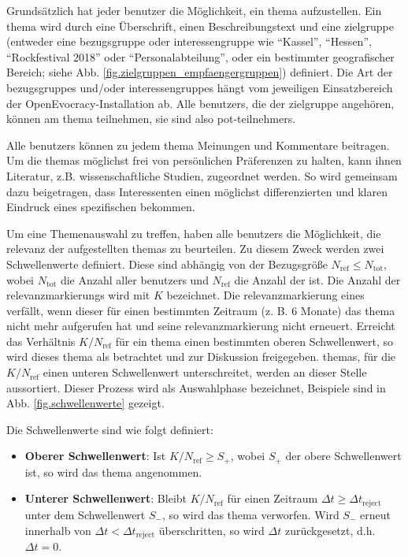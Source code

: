 \documentclass[10pt]{article}
\begin{document}
Grundsätzlich hat jeder \gls{benutzer} die Möglichkeit, ein \gls{thema} aufzustellen. Ein \gls{thema} wird durch eine Überschrift, einen Beschreibungstext und eine \gls{zielgruppe} (entweder eine \gls{bezugsgruppe} oder \gls{interessengruppe} wie ``Kassel'', ``Hessen'', ``Rockfestival 2018'' oder ``Personalabteilung'', oder ein bestimmter geografischer Bereich; siehe Abb. \ref{fig.zielgruppen_empfaengergruppen}) definiert. Die Art der \glspl{bezugsgruppe} und/oder \glspl{interessengruppe} hängt vom jeweiligen Einsatzbereich der OpenEvocracy-Installation ab. Alle \glspl{benutzer}, die der \gls{zielgruppe} angehören, können am \gls{thema} teilnehmen, sie sind also \glspl{pot-teilnehmer}.

Alle \glspl{benutzer} können zu jedem \gls{thema} Meinungen und Kommentare beitragen. Um die \glspl{thema} möglichst frei von persönlichen Präferenzen zu halten, kann ihnen Literatur, z.B. wissenschaftliche Studien, zugeordnet werden. So wird gemeinsam dazu beigetragen, dass Interessenten einen möglichst differenzierten und klaren Eindruck eines spezifischen  bekommen.

Um eine Themenauswahl zu treffen, haben alle \glspl{benutzer} die Möglichkeit, die \gls{relevanz} der aufgestellten \glspl{thema} zu beurteilen. Zu diesem Zweck werden zwei Schwellenwerte definiert. Diese sind abhängig von der Bezugsgröße $N_{\text{ref}} \le N_{\text{tot}}$, wobei $N_{\text{tot}}$ die Anzahl aller \glspl{benutzer} und $N_{\text{ref}}$ die Anzahl der  ist. Die Anzahl der \glspl{relevanzmarkierung} wird mit $K$ bezeichnet. Die \gls{relevanzmarkierung} eines  verfällt, wenn dieser für einen bestimmten Zeitraum (z. B. 6 Monate) das \gls{thema} nicht mehr aufgerufen hat und seine \gls{relevanzmarkierung} nicht erneuert. Erreicht das Verhältnis $K/N_{\text{ref}}$ für ein \gls{thema} einen bestimmten oberen Schwellenwert, so wird dieses \gls{thema} als  betrachtet und zur Diskussion freigegeben.  \glspl{thema}, für die $K/N_{\text{ref}}$ einen unteren Schwellenwert unterschreitet, werden an dieser Stelle aussortiert. Dieser Prozess wird als Auswahlphase bezeichnet, Beispiele sind in Abb. \ref{fig.schwellenwerte} gezeigt.

Die Schwellenwerte sind wie folgt definiert:

\begin{itemize}
    \item \textbf{Oberer Schwellenwert}: Ist $K/N_\text{ref} \geq S_+$, wobei $S_+$ der obere Schwellenwert ist, so wird das \gls{thema} angenommen.
    \item \textbf{Unterer Schwellenwert}: Bleibt $K/N_\text{ref}$ für einen Zeitraum $\Delta t \geq \Delta t_\text{reject}$ unter dem Schwellenwert $S_-$, so wird das \gls{thema} verworfen. Wird $S_-$ erneut innerhalb von $\Delta t < \Delta t_\text{reject}$ überschritten, so wird $\Delta t$ zurückgesetzt, d.h. $\Delta t=0$.
\end{itemize}
\end{document}
